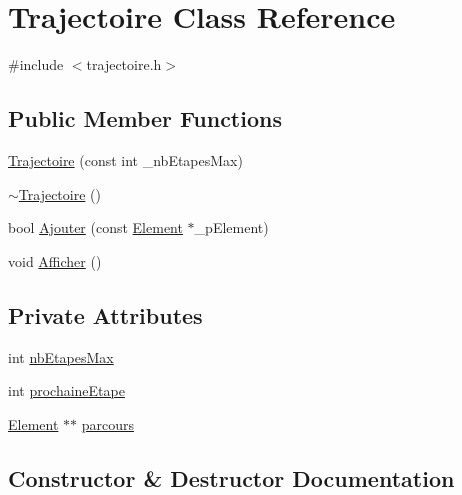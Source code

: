 \hypertarget{class_trajectoire}{}\section{Trajectoire Class Reference}
\label{class_trajectoire}


{\ttfamily \#include $<$trajectoire.\+h$>$}

\subsection*{Public Member Functions}
\begin{DoxyCompactItemize}
\item 
\hyperlink{class_trajectoire_a0703f0b87651b76f1e8744c9a3872205}{Trajectoire} (const int \+\_\+nb\+Etapes\+Max)
\item 
\hyperlink{class_trajectoire_a9249a7bd01726684494eeea9fde54b9e}{$\sim$\+Trajectoire} ()
\item 
bool \hyperlink{class_trajectoire_a12ae44f39805bb480c2f8bf3454ea342}{Ajouter} (const \hyperlink{class_element}{Element} $\ast$\+\_\+p\+Element)
\item 
void \hyperlink{class_trajectoire_ab2ab026cbcf416f397ff6ee7f8331cc4}{Afficher} ()
\end{DoxyCompactItemize}
\subsection*{Private Attributes}
\begin{DoxyCompactItemize}
\item 
int \hyperlink{class_trajectoire_a62cc9d5c52215094c7f0731e07cccbf5}{nb\+Etapes\+Max}
\item 
int \hyperlink{class_trajectoire_a56fb38e337100dcbc3c49727d8f68c6a}{prochaine\+Etape}
\item 
\hyperlink{class_element}{Element} $\ast$$\ast$ \hyperlink{class_trajectoire_a526de5df82ef3ae78757ecb441d4179e}{parcours}
\end{DoxyCompactItemize}


\subsection{Constructor \& Destructor Documentation}
\mbox{\label{class_trajectoire_a0703f0b87651b76f1e8744c9a3872205}} 
